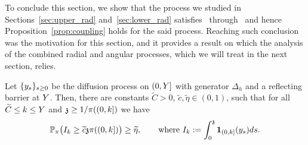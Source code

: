 To conclude this section, we show that the process we studied
in Sections~\ref{sec:upper_rad} and~\ref{sec:lower_rad}
satisfies~ through~ and hence Proposition~\ref{prop:coupling}  holds for the said process. Reaching such conclusion was the motivation for this section, and it provides a result on which the analysis of the combined radial and angular processes, which we will treat in the next section, relies.
\begin{corollary}\label{radial:cor:coupling}
Let $\{\auxy_s\}_{s\geq 0}$ be the diffusion process on $(0,\auxY]$ with
generator $\Delta_h$ and a reflecting barrier at $\auxY$. 
Then, there are constants $\widetilde{C}>0$, $\widetilde{c},\widetilde{\eta}\in (0,1)$, such that for all 
$\widetilde{C}\le k\le \auxY$ and $\ss\geq 1/\pi((0,k])$ we have  
\[
\PP_\pi\big(I_k\geq \widetilde{c} \ss\pi((0,k])\big) \geq \widetilde{\eta},
	\qquad\text{where $I_k := \int_0^\ss {\bf 1}_{(0,k]}(\auxy_s)ds$.}
\]
\end{corollary}
